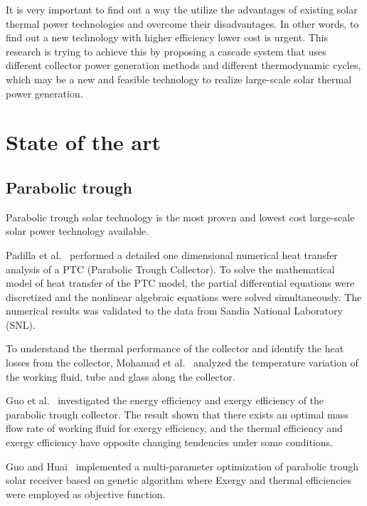 It is very important to find out a way the utilize the advantages of existing solar thermal power technologies and overcome their disadvantages. In other words, to find out a new technology with higher efficiency lower cost is urgent.
This research is trying to achieve this by proposing a cascade system that uses different collector power generation methods and different thermodynamic cycles, which may be a new and feasible technology to realize large-scale solar thermal power generation.

\section{State of the art}

\subsection{Parabolic trough}\label{sec:pt}

Parabolic trough solar technology is the most proven and lowest cost large-scale solar power technology available.~\cite{Price2002}

Padilla et al.~\cite{Padilla2011} performed a detailed one dimensional numerical heat transfer analysis of a PTC (Parabolic Trough Collector). To solve the mathematical model of heat transfer of the PTC model, the partial differential equations were discretized and the nonlinear algebraic equations were solved simultaneously. The numerical results was validated to the data from Sandia National Laboratory (SNL).

To understand the thermal performance of the collector and identify the heat losses from the collector, Mohamad et al.~\cite{Mohamad2014} analyzed the temperature variation of the working fluid, tube and glass along the collector.

Guo et al.~\cite{JiangfengGuo2016-1} investigated the energy efficiency and exergy efficiency of the parabolic trough collector. The result shown that there exists an optimal mass flow rate of working fluid for exergy efficiency, and the thermal efficiency and exergy efficiency have opposite changing tendencies under some conditions.

Guo and Huai~\cite{JiangfengGuo2016-2} implemented a multi-parameter optimization of parabolic trough solar receiver based on genetic algorithm where Exergy and thermal efficiencies were employed as objective function.

